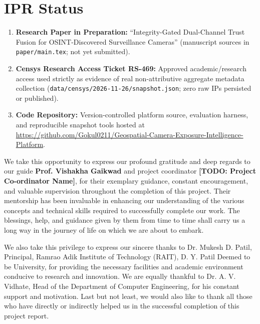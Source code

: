 \documentclass{RAITreport}
\begin{document}
\chapter{IPR Status}
\begin{enumerate}
  \item \textbf{Research Paper in Preparation:} ``Integrity-Gated Dual-Channel Trust Fusion for OSINT-Discovered Surveillance Cameras'' (manuscript sources in \texttt{paper/main.tex}; not yet submitted).
  \item \textbf{Censys Research Access Ticket RS-469:} Approved academic/research access used strictly as evidence of real non-attributive aggregate metadata collection (\texttt{data/censys/2026-11-26/snapshot.json}; zero raw IPs persisted or published).
  \item \textbf{Code Repository:} Version-controlled platform source, evaluation harness, and reproducible snapshot tools hosted at \url{https://github.com/Gokul0211/Geospatial-Camera-Exposure-Intelligence-Platform}.
\end{enumerate}

\begin{acknowledgments}\thispagestyle{plain}
We take this opportunity to express our profound gratitude and deep regards to our guide \textbf{Prof. Vishakha Gaikwad} and project coordinator \textbf{[TODO: Project Co-ordinator Name]}, for their exemplary guidance, constant encouragement, and valuable supervision throughout the completion of this project. Their mentorship has been invaluable in enhancing our understanding of the various concepts and technical skills required to successfully complete our work. The blessings, help, and guidance given by them from time to time shall carry us a long way in the journey of life on which we are about to embark.

We also take this privilege to express our sincere thanks to Dr. Mukesh D. Patil, Principal, Ramrao Adik Institute of Technology (RAIT), D. Y. Patil Deemed to be University, for providing the necessary facilities and academic environment conducive to research and innovation. We are equally thankful to Dr. A. V. Vidhate, Head of the Department of Computer Engineering, for his constant support and motivation. Last but not least, we would also like to thank all those who have directly or indirectly helped us in the successful completion of this project report.
\end{acknowledgments}
\end{document}
